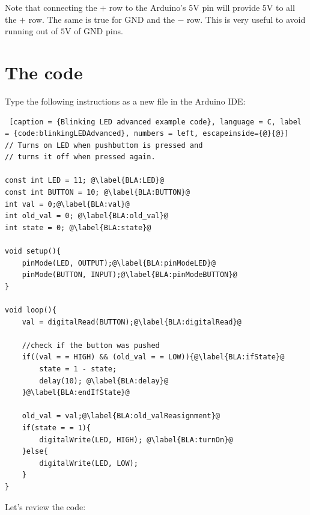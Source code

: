 Note that connecting the $+$ row to the Arduino's $5$V pin will provide $5$V to all the $+$ row. The same is true for GND and the $-$ row. This is very useful to avoid running out of $5$V of GND pins.


\section{The code}

Type the following instructions as a new file in the Arduino IDE:

\begin{lstlisting} [caption = {Blinking LED advanced example code}, language = C, label = {code:blinkingLEDAdvanced}, numbers = left, escapeinside={@}{@}]
// Turns on LED when pushbuttom is pressed and
// turns it off when pressed again.

const int LED = 11; @\label{BLA:LED}@
const int BUTTON = 10; @\label{BLA:BUTTON}@
int val = 0;@\label{BLA:val}@
int old_val = 0; @\label{BLA:old_val}@
int state = 0; @\label{BLA:state}@

void setup(){
	pinMode(LED, OUTPUT);@\label{BLA:pinModeLED}@
	pinMode(BUTTON, INPUT);@\label{BLA:pinModeBUTTON}@
}

void loop(){
	val = digitalRead(BUTTON);@\label{BLA:digitalRead}@
	
	//check if the button was pushed
	if((val = = HIGH) && (old_val = = LOW)){@\label{BLA:ifState}@
		state = 1 - state;
		delay(10); @\label{BLA:delay}@
	}@\label{BLA:endIfState}@
	
	old_val = val;@\label{BLA:old_valReasignment}@
	if(state = = 1){
		digitalWrite(LED, HIGH); @\label{BLA:turnOn}@
	}else{
		digitalWrite(LED, LOW);
	}
}
\end{lstlisting}

Let's review the code:


